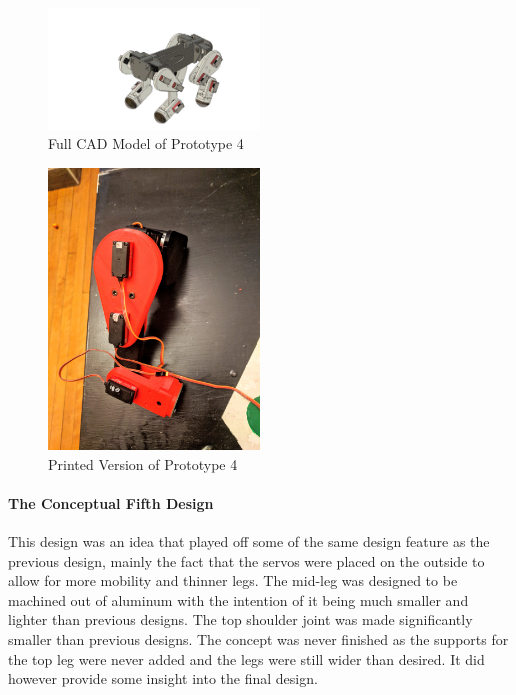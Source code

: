           \begin{figure}[H]
                \centering
                \includegraphics[width=0.5\textwidth]{figures/Prototype4Full.png}
                \caption{Full CAD Model of Prototype 4}
                \label{fig:Prototype4}
        \end{figure}                
            
        \begin{figure}[H]
                \centering
                \includegraphics[width=0.5\textwidth]{figures/Prototype4Printed.jpg}
                \caption{Printed Version of Prototype 4}
                \label{fig:Prototype4Printed}
        \end{figure}  
        
        \paragraph{The Conceptual Fifth Design}
        This design was an idea that played off some of the same design feature as the previous design, mainly the fact that the servos were placed on the outside to allow for more mobility and thinner legs. The mid-leg was designed to be machined out of aluminum with the intention of it being much smaller and lighter than previous designs. The top shoulder joint was made significantly smaller than previous designs. The concept was never finished as the supports for the top leg were never added and the legs were still wider than desired. It did however provide some insight into the final design.
         
